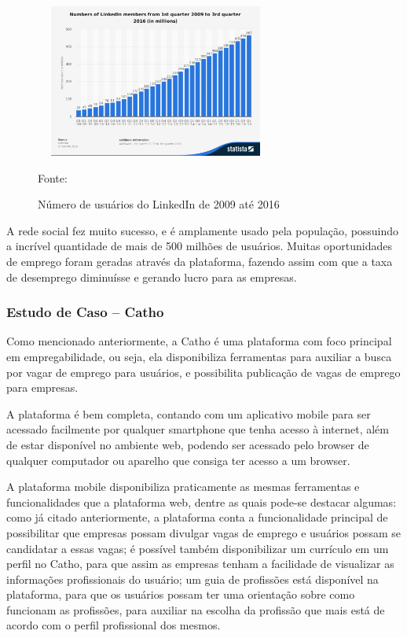 \begin{figure}[!h]
	\centering
			
	\caption{Número de usuários do LinkedIn de 2009 até 2016 }
	\includegraphics[width=300px, height=190px]{./images/linkedinMobile2.png}
	\label{fig:Número}
	\par {Fonte: \cite{linkedin-c}}
\end{figure}

A rede social fez muito sucesso, e é amplamente usado pela população, possuindo a incrível quantidade de mais de 500 milhões de usuários. Muitas oportunidades de emprego foram geradas através da plataforma, fazendo assim com que a taxa de desemprego diminuísse e gerando lucro para as empresas.


\subsubsection{Estudo de Caso – Catho}

Como mencionado anteriormente, a Catho é uma plataforma com foco principal em empregabilidade, ou seja, ela disponibiliza ferramentas para auxiliar a busca por vagar de emprego para usuários, e possibilita publicação de vagas de emprego para empresas.

A plataforma é bem completa, contando com um aplicativo mobile para ser acessado facilmente por qualquer smartphone que tenha acesso à internet, além de estar disponível no ambiente web, podendo ser acessado pelo browser de qualquer computador ou aparelho que consiga ter acesso a um browser.

A plataforma mobile disponibiliza praticamente as mesmas ferramentas e funcionalidades que a plataforma web, dentre as quais pode-se destacar algumas: como já citado anteriormente, a plataforma conta a funcionalidade principal de possibilitar que empresas possam divulgar vagas de emprego e usuários possam se candidatar a essas vagas; é possível também disponibilizar um currículo em um perfil no Catho, para que assim as empresas tenham a facilidade de visualizar as informações profissionais do usuário; um guia de profissões está disponível na plataforma, para que os usuários possam ter uma orientação sobre como funcionam as profissões, para auxiliar na escolha da profissão que mais está de acordo com o perfil profissional dos mesmos.

